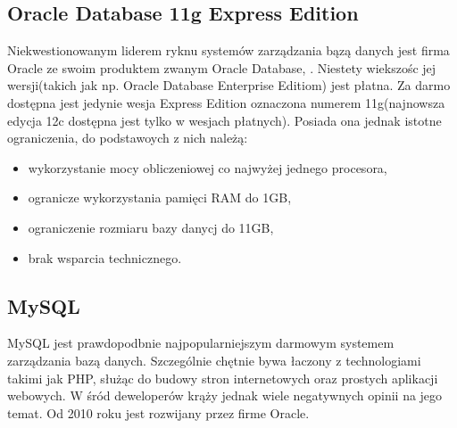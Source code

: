 \subsection[Oracle Database 11g Express Edition][Oracle Database 11g Express Edition]{Oracle Database 11g Express Edition} 
Niekwestionowanym liderem ryknu systemów zarządzania bązą danych jest firma Oracle ze swoim produktem zwanym Oracle Database, . Niestety wiekszośc jej wersji(takich jak np. Oracle Database Enterprise Editiom) jest płatna. Za darmo dostępna jest jedynie wesja Express Edition oznaczona numerem 11g(najnowsza edycja 12c dostępna jest tylko w wesjach płatnych).  Posiada ona jednak istotne ograniczenia, do podstawoych z nich należą:
\begin{itemize}
	\item wykorzystanie mocy obliczeniowej co najwyżej jednego procesora,
	\item ogranicze wykorzystania pamięci RAM do 1GB,
	\item ograniczenie rozmiaru bazy danycj do 11GB,
	\item brak wsparcia technicznego.
\end{itemize}

\subsection[MySQL][MySQL]{MySQL} 
MySQL jest prawdopodbnie najpopularniejszym darmowym systemem zarządzania bazą danych. Szczególnie chętnie bywa łaczony z technologiami takimi jak PHP, służąc do budowy stron internetowych oraz prostych aplikacji webowych. W śród deweloperów krąży jednak wiele negatywnych opinii na jego temat. Od 2010 roku jest rozwijany przez firme Oracle.

